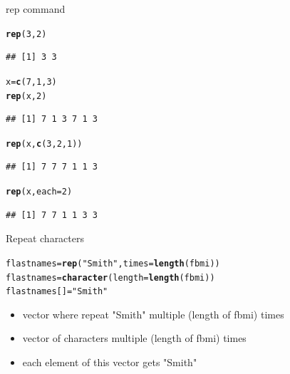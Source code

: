 \documentclass{beamer}\usepackage[]{graphicx}\usepackage[]{color}
\makeatletter
\newcommand{\hlnum}[1]{\textcolor[rgb]{0.686,0.059,0.569}{#1}}%
\newcommand{\hlstr}[1]{\textcolor[rgb]{0.192,0.494,0.8}{#1}}%
\newcommand{\hlstd}[1]{\textcolor[rgb]{0.345,0.345,0.345}{#1}}%
\newcommand{\hlkwb}[1]{\textcolor[rgb]{0.69,0.353,0.396}{#1}}%
\newcommand{\hlkwc}[1]{\textcolor[rgb]{0.333,0.667,0.333}{#1}}%
\newcommand{\hlkwd}[1]{\textcolor[rgb]{0.737,0.353,0.396}{\textbf{#1}}}%
\newenvironment{kframe}{%
 \def\at@end@of@kframe{}%
 \ifinner\ifhmode%
  \def\at@end@of@kframe{\end{minipage}}%
  \begin{minipage}{\columnwidth}%
 \fi\fi%
 \def\FrameCommand##1{\hskip\@totalleftmargin \hskip-\fboxsep
 \colorbox{shadecolor}{##1}\hskip-\fboxsep
     \hskip-\linewidth \hskip-\@totalleftmargin \hskip\columnwidth}%
 \MakeFramed {\advance\hsize-\width
   \@totalleftmargin\z@ \linewidth\hsize
   \@setminipage}}%
 {\par\unskip\endMakeFramed%
 \at@end@of@kframe}
\newenvironment{knitrout}{}{} %
\renewenvironment{knitrout}{\begin{singlespace}}{\end{singlespace}}
\theoremstyle{mystyle}
\makeatother
\begin{document}
\begin{frame}[fragile]{rep command}
\begin{knitrout}
\color{fgcolor}\begin{kframe}
\begin{alltt}
\hlkwd{rep}\hlstd{(}\hlnum{3}\hlstd{,}\hlnum{2}\hlstd{)}
\end{alltt}
\begin{verbatim}
## [1] 3 3
\end{verbatim}
\begin{alltt}
\hlstd{x} \hlkwb{=} \hlkwd{c}\hlstd{(}\hlnum{7}\hlstd{,}\hlnum{1}\hlstd{,}\hlnum{3}\hlstd{)}
\hlkwd{rep}\hlstd{(x,} \hlnum{2}\hlstd{)}
\end{alltt}
\begin{verbatim}
## [1] 7 1 3 7 1 3
\end{verbatim}
\begin{alltt}
\hlkwd{rep}\hlstd{(x,} \hlkwd{c}\hlstd{(}\hlnum{3}\hlstd{,} \hlnum{2}\hlstd{,} \hlnum{1}\hlstd{))}
\end{alltt}
\begin{verbatim}
## [1] 7 7 7 1 1 3
\end{verbatim}
\begin{alltt}
\hlkwd{rep}\hlstd{(x,} \hlkwc{each} \hlstd{=} \hlnum{2}\hlstd{)}
\end{alltt}
\begin{verbatim}
## [1] 7 7 1 1 3 3
\end{verbatim}
\end{kframe}
\end{knitrout}
\end{frame}

\begin{frame}[fragile]{Repeat characters}%
\begin{knitrout}
\color{fgcolor}\begin{kframe}
\begin{alltt}
\hlstd{flastnames} \hlkwb{=} \hlkwd{rep}\hlstd{(}\hlstr{"Smith"}\hlstd{,}\hlkwc{times} \hlstd{=} \hlkwd{length}\hlstd{(fbmi))}
\hlstd{flastnames} \hlkwb{=} \hlkwd{character}\hlstd{(}\hlkwc{length} \hlstd{=} \hlkwd{length}\hlstd{(fbmi))}
\hlstd{flastnames[ ]} \hlkwb{=} \hlstr{"Smith"}
\end{alltt}
\end{kframe}
\end{knitrout}
\begin{itemize}
\item vector where repeat "Smith" multiple (length of fbmi) times
\item vector of characters multiple (length of fbmi) times
\item each element of this vector gets "Smith"
\end{itemize}
\end{frame}
\end{document}
